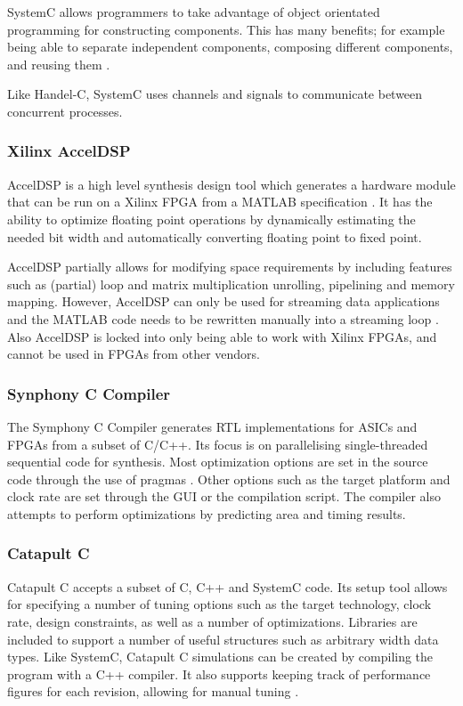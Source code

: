 SystemC allows programmers to take advantage of object orientated programming for
constructing components. This has many benefits; for example being able to separate
independent components, composing different components, and reusing them \cite{systemc3}. 

Like Handel-C, SystemC uses channels and signals to communicate between concurrent processes.



\subsubsection{Xilinx AccelDSP}
AccelDSP is a high level synthesis design tool which generates a hardware module that can be run
on a Xilinx FPGA from a MATLAB specification \cite{accel}. It has the ability to optimize floating
point operations by dynamically estimating the needed bit width and automatically converting floating
point to fixed point.  

AccelDSP partially allows for modifying space requirements by including features such as (partial) loop
and matrix multiplication unrolling, pipelining and memory mapping.
However, AccelDSP can only be used for streaming data applications and the MATLAB code 
needs to be rewritten manually into a streaming loop \cite{hlstools}. Also AccelDSP is locked
into only being able to work with Xilinx FPGAs, and cannot be used in FPGAs from other vendors.


\subsubsection{Synphony C Compiler}
The Symphony C Compiler\cite{syn} generates RTL implementations for ASICs and FPGAs
from a subset of C/C++. Its focus is on parallelising single-threaded sequential code for
synthesis. Most optimization options are set in the source code through the use of pragmas \cite{hlstools}.
Other options such as the target platform and clock rate are set through the GUI or the
compilation script. The compiler also attempts to perform optimizations by predicting
area and timing results.


\subsubsection{Catapult C}
Catapult C\cite{catapult} accepts a subset of C, C++ and SystemC code. Its setup tool allows for specifying 
a number of tuning options such as the target technology, clock rate, design constraints, as well as a number 
of optimizations. Libraries are included to support a number of useful structures such as arbitrary width data types.
Like SystemC, Catapult C simulations can be created by compiling the program with a C++ compiler. 
It also supports keeping track of performance figures for each revision, allowing for manual tuning \cite{hlstools}.





